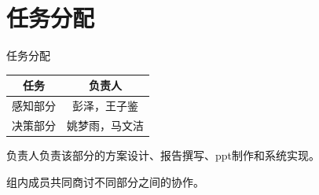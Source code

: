 \section{任务分配}
\begin{frame}{任务分配}
    \begin{table}[h]
        \centering
        \begin{tabular}{cc}
            \toprule
            任务 & 负责人\\
            \midrule
            感知部分 & 彭泽，王子鉴\\
            决策部分 & 姚梦雨，马文洁\\
            \bottomrule
        \end{tabular}
    \end{table}
    负责人负责该部分的方案设计、报告撰写、ppt制作和系统实现。

    组内成员共同商讨不同部分之间的协作。
\end{frame}